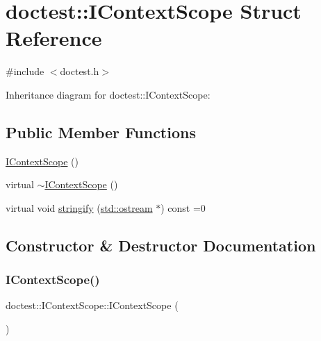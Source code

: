 \hypertarget{structdoctest_1_1IContextScope}{}\section{doctest\+:\+:I\+Context\+Scope Struct Reference}
\label{structdoctest_1_1IContextScope}


{\ttfamily \#include $<$doctest.\+h$>$}



Inheritance diagram for doctest\+:\+:I\+Context\+Scope\+:
\subsection*{Public Member Functions}
\begin{DoxyCompactItemize}
\item 
\hyperlink{structdoctest_1_1IContextScope_a067a2f9a9e53b010eb7b0a2ab88c76fd}{I\+Context\+Scope} ()
\item 
virtual \hyperlink{structdoctest_1_1IContextScope_aa99357c233d6a040451628bc6a6c6c2e}{$\sim$\+I\+Context\+Scope} ()
\item 
virtual void \hyperlink{structdoctest_1_1IContextScope_affbf0f9bf8107a4a8a805d237288141d}{stringify} (\hyperlink{doctest_8h_a116af65cb5e924b33ad9d9ecd7a783f3}{std\+::ostream} $\ast$) const =0
\end{DoxyCompactItemize}


\subsection{Constructor \& Destructor Documentation}
\mbox{\label{structdoctest_1_1IContextScope_a067a2f9a9e53b010eb7b0a2ab88c76fd}} 
\subsubsection{\texorpdfstring{I\+Context\+Scope()}{IContextScope()}}
{\footnotesize\ttfamily doctest\+::\+I\+Context\+Scope\+::\+I\+Context\+Scope (\begin{DoxyParamCaption}{ }\end{DoxyParamCaption})}

\mbox{\label{structdoctest_1_1IContextScope_aa99357c233d6a040451628bc6a6c6c2e}} 
